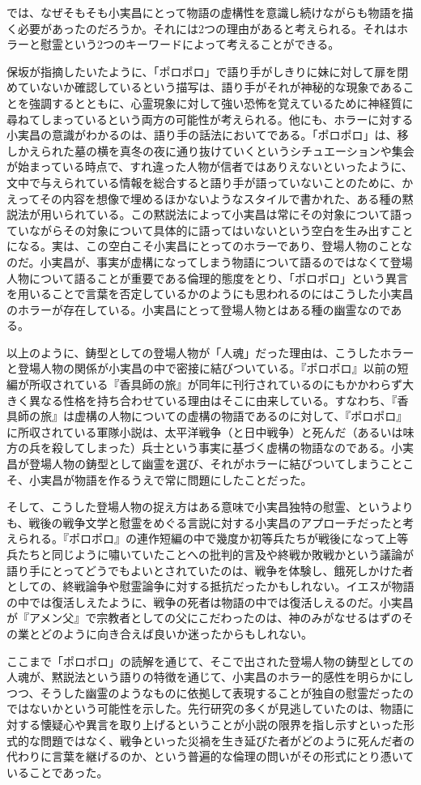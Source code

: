 では、なぜそもそも小実昌にとって物語の虚構性を意識し続けながらも物語を描く必要があったのだろうか。それには2つの理由があると考えられる。それはホラーと慰霊という2つのキーワードによって考えることができる。

保坂が指摘したいたように、「ポロポロ」で語り手がしきりに妹に対して扉を閉めていないか確認しているという描写は、語り手がそれが神秘的な現象であることを強調するとともに、心霊現象に対して強い恐怖を覚えているために神経質に尋ねてしまっているという両方の可能性が考えられる。他にも、ホラーに対する小実昌の意識がわかるのは、語り手の話法においてである。「ポロポロ」は、移しかえられた墓の横を真冬の夜に通り抜けていくというシチュエーションや集会が始まっている時点で、すれ違った人物が信者ではありえないといったように、文中で与えられている情報を総合すると語り手が語っていないことのために、かえってその内容を想像で埋めるほかないようなスタイルで書かれた、ある種の黙説法が用いられている。この黙説法によって小実昌は常にその対象について語っていながらその対象について具体的に語ってはいないという空白を生み出すことになる。実は、この空白こそ小実昌にとってのホラーであり、登場人物のことなのだ。小実昌が、事実が虚構になってしまう物語について語るのではなくて登場人物について語ることが重要である倫理的態度をとり、「ポロポロ」という異言を用いることで言葉を否定しているかのようにも思われるのにはこうした小実昌のホラーが存在している。小実昌にとって登場人物とはある種の幽霊なのである。

以上のように、鋳型としての登場人物が「人魂」だった理由は、こうしたホラーと登場人物の関係が小実昌の中で密接に結びついている。『ポロポロ』以前の短編が所収されている『香具師の旅』が同年に刊行されているのにもかかわらず大きく異なる性格を持ち合わせている理由はそこに由来している。すなわち、『香具師の旅』は虚構の人物についての虚構の物語であるのに対して、『ポロポロ』に所収されている軍隊小説は、太平洋戦争（と日中戦争）と死んだ（あるいは味方の兵を殺してしまった）兵士という事実に基づく虚構の物語なのである。小実昌が登場人物の鋳型として幽霊を選び、それがホラーに結びついてしまうことこそ、小実昌が物語を作るうえで常に問題にしたことだった。

そして、こうした登場人物の捉え方はある意味で小実昌独特の慰霊、というよりも、戦後の戦争文学と慰霊をめぐる言説に対する小実昌のアプローチだったと考えられる。『ポロポロ』の連作短編の中で幾度か初等兵たちが戦後になって上等兵たちと同じように嘯いていたことへの批判的言及や終戦か敗戦かという議論が語り手にとってどうでもよいとされていたのは、戦争を体験し、餓死しかけた者としての、終戦論争や慰霊論争に対する抵抗だったかもしれない。イエスが物語の中では復活しえたように、戦争の死者は物語の中では復活しえるのだ。小実昌が『アメン父』で宗教者としての父にこだわったのは、神のみがなせるはずのその業とどのように向き合えば良いか迷ったからもしれない。

ここまで「ポロポロ」の読解を通じて、そこで出された登場人物の鋳型としての人魂が、黙説法という語りの特徴を通じて、小実昌のホラー的感性を明らかにしつつ、そうした幽霊のようなものに依拠して表現することが独自の慰霊だったのではないかという可能性を示した。先行研究の多くが見逃していたのは、物語に対する懐疑心や異言を取り上げるということが小説の限界を指し示すといった形式的な問題ではなく、戦争といった災禍を生き延びた者がどのように死んだ者の代わりに言葉を継げるのか、という普遍的な倫理の問いがその形式にとり憑いていることであった。
